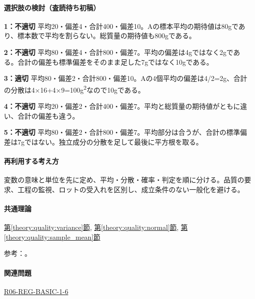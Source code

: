 \paragraph{選択肢の検討（査読待ち初稿）}\mbox{}\par

\noindent\textbf{1：不適切} 平均20・偏差4・合計400・偏差10。Aの標本平均の期待値は80gであり、標本数で平均を割らない。総質量の期待値も800gである。\par

\noindent\textbf{2：不適切} 平均80・偏差4・合計800・偏差7。平均の偏差は4gではなく2gである。合計の偏差も標準偏差をそのまま足した7gではなく10gである。\par

\noindent\textbf{3：適切} 平均80・偏差2・合計800・偏差10。Aの4個平均の偏差は4/2=\allowbreak{}2g、合計の分散は4×16+4×9=\allowbreak{}100g\textsuperscript{2}なので10gである。\par

\noindent\textbf{4：不適切} 平均20・偏差2・合計400・偏差7。平均と総質量の期待値がともに違い、合計の偏差も違う。\par

\noindent\textbf{5：不適切} 平均80・偏差2・合計800・偏差7。平均部分は合うが、合計の標準偏差は7gではない。独立成分の分散を足して最後に平方根を取る。\par

\paragraph{再利用する考え方} 変数の意味と単位を先に定め、平均・分散・確率・判定を順に分ける。品質の要求、工程の監視、ロットの受入れを区別し、成立条件のない一般化を避ける。

\paragraph{共通理論} \hyperref[theory:quality:variance]{第\ref*{theory:quality:variance}節}, \hyperref[theory:quality:normal]{第\ref*{theory:quality:normal}節}, \hyperref[theory:quality:sample_mean]{第\ref*{theory:quality:sample_mean}節}

\par 参考：\cite{stat_nist_normal,stat_psu_linear}。

\paragraph{関連問題} \hyperref[q:r06-reg-basic-1-6]{R06-REG-BASIC-1-6}

